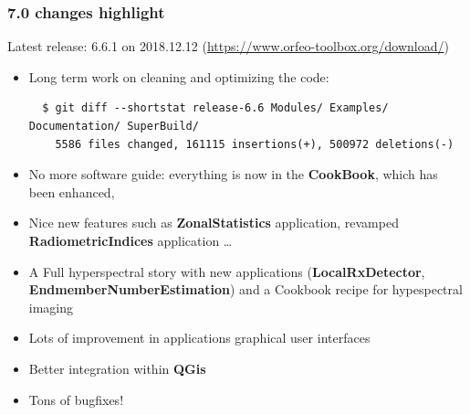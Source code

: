 \documentclass[8pt,aspectratio=169]{beamer}
\begin{document}
    \begin{frame}[fragile]
    \frametitle{7.0 changes highlight}
    \begin{center}
      Latest release: 6.6.1 on 2018.12.12 (\small{\url{https://www.orfeo-toolbox.org/download/}})\\
      \vspace{0.1cm}
      \color{red}{7.0.0 release schedule: 2019.06}
    \end{center}
    \begin{itemize}
    \item Long term work on cleaning and optimizing the code:
      \begin{small}
      \begin{verbatim}
  $ git diff --shortstat release-6.6 Modules/ Examples/ Documentation/ SuperBuild/
    5586 files changed, 161115 insertions(+), 500972 deletions(-)
      \end{verbatim}
      \end{small}
    \item No more software guide: everything is now in the \textbf{CookBook}, which has been enhanced,
    \item Nice new features such as \textbf{ZonalStatistics} application, revamped \textbf{RadiometricIndices} application \ldots
    \item A Full hyperspectral story with new applications (\textbf{LocalRxDetector}, \textbf{EndmemberNumberEstimation}) and a Cookbook recipe for hypespectral imaging
    \item Lots of improvement in applications graphical user interfaces
    \item Better integration within \textbf{QGis}
    \item Tons of bugfixes!
      
    \end{itemize}

    \end{frame}
\end{document}
